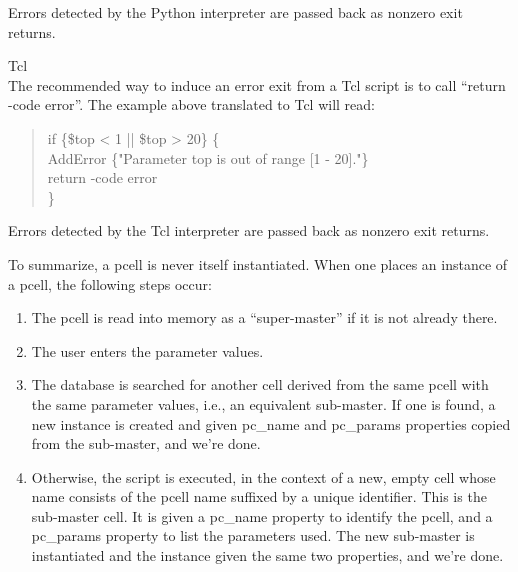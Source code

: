 \begin{description}
Errors detected by the Python interpreter are passed back as nonzero
exit returns.

\item{Tcl}\\
The recommended way to induce an error exit from a Tcl script is to
call ``{\vt return -code error}''.  The example above translated to
Tcl will read:
\begin{quote} \vt
if \{\$top < 1 || \$top > 20\} \{\\
\hspace*{5mm}AddError \{"Parameter top is out of range [1 - 20]."\}\\
\hspace*{5mm}return -code error\\
\}
\end{quote}

Errors detected by the Tcl interpreter are passed back as nonzero exit
returns.
\end{description}

To summarize, a pcell is never itself instantiated.  When one
places an instance of a pcell, the following steps occur:

\begin{enumerate}
\item{The pcell is read into memory as a ``super-master'' if it
is not already there.}

\item{The user enters the parameter values.}

\item{The database is searched for another cell derived from the same
pcell with the same parameter values, i.e., an equivalent sub-master. 
If one is found, a new instance is created and given {\et pc\_name}
and {\et pc\_params} properties copied from the sub-master, and we're
done.}

\item{Otherwise, the script is executed, in the context of a new,
empty cell whose name consists of the pcell name suffixed by a unique
identifier.  This is the sub-master cell.  It is given a {\et
pc\_name} property to identify the pcell, and a {\et pc\_params}
property to list the parameters used.  The new sub-master is
instantiated and the instance given the same two properties, and we're
done.}
\end{enumerate}


